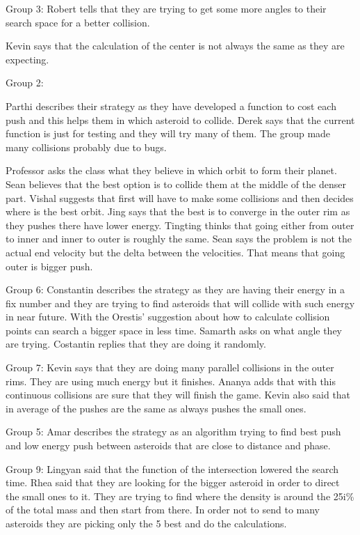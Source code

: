 Group 3:
Robert tells that they are trying to get some more angles to their search space for a better collision.

Kevin says that the calculation of the center is not always the same as they are expecting.

Group 2:

Parthi describes their strategy as they have developed a function to cost each push and this helps them in which asteroid to collide.
Derek says that the current function is just for testing and they will try many of them.
The group made many collisions probably due to bugs.
 
Professor asks the class what they believe in which orbit to form their planet.
Sean believes that the best option is to collide them at the middle of the denser part.
Vishal suggests that first will have to make some collisions and then decides where is the best orbit.
Jing says that the best is to converge in the outer rim as they pushes there have lower energy.
Tingting thinks that going either from outer to inner and inner to outer is roughly the same.
Sean says the problem is not the actual end velocity but the delta between the velocities.
That means that going outer is bigger push.

Group 6:
Constantin describes the strategy as they are having their energy in a fix number 
and they are trying to find asteroids that will collide with such energy in near 
future. With the Orestis’ suggestion about how to calculate collision points can 
search a bigger space in less time.
Samarth asks on what angle they are trying.
Costantin replies that they are doing it randomly.



Group 7:
Kevin says that they are doing many parallel collisions in the outer rims. They are using much energy but it finishes. 
Ananya adds that with this continuous collisions are sure that they will finish the game.
Kevin also said that in average of the pushes are the same as always pushes the small ones.

Group 5:
Amar describes the strategy as an algorithm trying to find best push and low energy push between asteroids that are close to distance and phase.

Group 9:
Lingyan said that the function of the intersection lowered the search time. 
Rhea said that they are looking for the bigger asteroid in order to direct the small ones to it.
They are trying to find where the density is around the 25i\% of the total mass and then start from there. In order not to send to many asteroids they are picking only the 5 best and do the calculations. 

